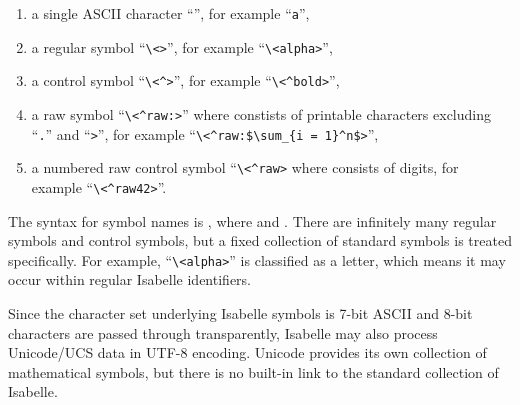 \begin{isabellebody}
\begin{isamarkuptext}
  \begin{enumerate}

  \item a single ASCII character ``'', for example
  ``\verb,a,'',

  \item a regular symbol ``\verb,\,\verb,<,\verb,>,'',
  for example ``\verb,\,\verb,<alpha>,'',

  \item a control symbol ``\verb,\,\verb,<^,\verb,>,'',
  for example ``\verb,\,\verb,<^bold>,'',

  \item a raw symbol ``\verb,\,\verb,<^raw:,\verb,>,''
  where  constists of printable characters excluding
  ``\verb,.,'' and ``\verb,>,'', for example
  ``\verb,\,\verb,<^raw:$\sum_{i = 1}^n$>,'',

  \item a numbered raw control symbol ``\verb,\,\verb,<^raw,\verb,>, where  consists of digits, for example
  ``\verb,\,\verb,<^raw42>,''.

  \end{enumerate}

  \noindent The  syntax for symbol names is , where  and .  There are infinitely many
  regular symbols and control symbols, but a fixed collection of
  standard symbols is treated specifically.  For example,
  ``\verb,\,\verb,<alpha>,'' is classified as a letter, which means it
  may occur within regular Isabelle identifiers.

  Since the character set underlying Isabelle symbols is 7-bit ASCII
  and 8-bit characters are passed through transparently, Isabelle may
  also process Unicode/UCS data in UTF-8 encoding.  Unicode provides
  its own collection of mathematical symbols, but there is no built-in
  link to the standard collection of Isabelle.


\end{isamarkuptext}
\end{isabellebody}
